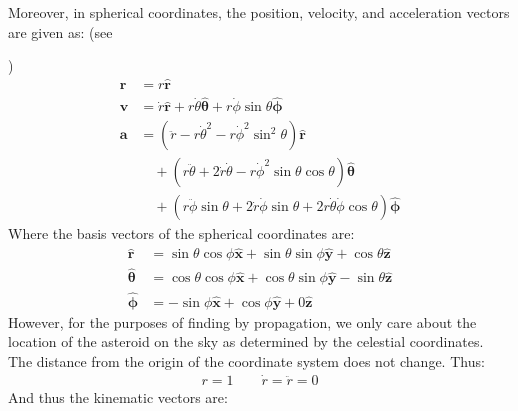 \documentclass[letterpaper,11pt,english]{sphinxmanual}
\begin{document}
\sphinxAtStartPar
Moreover, in spherical coordinates, the position, velocity, and acceleration
vectors are given as: (see %
\begin{footnote}[45]\sphinxAtStartFootnote
{}
%
\end{footnote})
\begin{equation*}
\begin{split}\mathbf{r} &= r \mathbf{\hat r} \\
\mathbf{v} &= \dot{r} \mathbf{\hat r} + r \dot\theta \hat{\boldsymbol\theta } + r \dot\phi \sin\theta \mathbf{\hat{\boldsymbol\phi}} \\
\mathbf{a} &= \left(\ddot{r} - r\dot\theta^2 - r\dot\phi^2\sin^2\theta \right)\mathbf{\hat r} \\
 &\quad + \left( r\ddot\theta + 2\dot{r}\dot\theta - r\dot\phi^2\sin\theta\cos\theta \right) \hat{\boldsymbol\theta } \\
 &\quad + \left( r\ddot\phi\sin\theta + 2\dot{r}\dot\phi\sin\theta + 2 r\dot\theta\dot\phi\cos\theta \right) \hat{\boldsymbol\phi}\end{split}
\end{equation*}
\sphinxAtStartPar
Where the basis vectors of the spherical coordinates are:
\begin{equation*}
\begin{split}\hat{\mathbf r} &= \sin\theta \cos\phi \hat{\mathbf x} + \sin\theta \sin\phi \hat{\mathbf y} + \cos\theta \hat{\mathbf z} \\
\hat{\boldsymbol\theta} &= \cos\theta \cos\phi \hat{\mathbf x} + \cos\theta \sin\phi \hat{\mathbf y} - \sin\theta \hat{\mathbf z} \\
\hat{\boldsymbol\phi} &= - \sin\phi \hat{\mathbf x} + \cos\phi \hat{\mathbf y} + 0 \hat{\mathbf z}\end{split}
\end{equation*}
\sphinxAtStartPar
However, for the purposes of finding by propagation, we only care about the
location of the asteroid on the sky as determined by the celestial coordinates.
The distance from the origin of the coordinate system does not change. Thus:
\begin{equation*}
\begin{split}r = 1 \qquad \dot{r} = \ddot{r} = 0\end{split}
\end{equation*}
\sphinxAtStartPar
And thus the kinematic vectors are:
\end{document}
